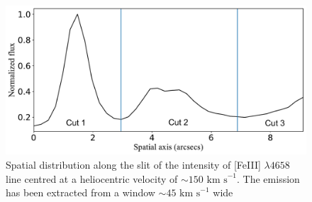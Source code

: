 \documentclass[fleqn,usenatbib]{mnras}
\begin{document}
\begin{figure}
\includegraphics[width=\columnwidth]{brillo_4658_HH514.pdf}
\caption{Spatial distribution along the slit of the intensity of [Fe\thinspace III] $\lambda 4658$ line centred at a heliocentric velocity of $\sim 150 \text{ km s}^{-1}$.  The emission has been extracted from a window $\sim 45 \text{ km s}^{-1}$ wide }
\label{fig:spatial_dis}
\end{figure}
\end{document}
